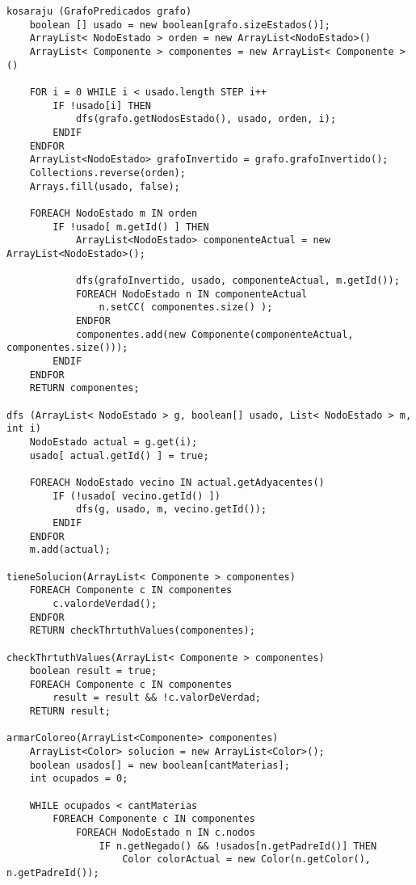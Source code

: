 \begin{verbatim}
kosaraju (GrafoPredicados grafo)
    boolean [] usado = new boolean[grafo.sizeEstados()];  
    ArrayList< NodoEstado > orden = new ArrayList<NodoEstado>() 
    ArrayList< Componente > componentes = new ArrayList< Componente >() 
    
    FOR i = 0 WHILE i < usado.length STEP i++
        IF !usado[i] THEN
            dfs(grafo.getNodosEstado(), usado, orden, i);
        ENDIF
    ENDFOR
    ArrayList<NodoEstado> grafoInvertido = grafo.grafoInvertido(); 
    Collections.reverse(orden); 
    Arrays.fill(usado, false); 
    
    FOREACH NodoEstado m IN orden 
        IF !usado[ m.getId() ] THEN
            ArrayList<NodoEstado> componenteActual = new ArrayList<NodoEstado>(); 
            
            dfs(grafoInvertido, usado, componenteActual, m.getId());
            FOREACH NodoEstado n IN componenteActual 
                n.setCC( componentes.size() ); 
            ENDFOR
            componentes.add(new Componente(componenteActual, componentes.size())); 
        ENDIF
    ENDFOR
    RETURN componentes;

dfs (ArrayList< NodoEstado > g, boolean[] usado, List< NodoEstado > m, int i)
    NodoEstado actual = g.get(i); 
    usado[ actual.getId() ] = true; 
    
    FOREACH NodoEstado vecino IN actual.getAdyacentes()
        IF (!usado[ vecino.getId() ])
            dfs(g, usado, m, vecino.getId());
        ENDIF
    ENDFOR
    m.add(actual);

tieneSolucion(ArrayList< Componente > componentes)
    FOREACH Componente c IN componentes
        c.valordeVerdad();    
    ENDFOR
    RETURN checkThrtuthValues(componentes);

checkThrtuthValues(ArrayList< Componente > componentes)
    boolean result = true;
    FOREACH Componente c IN componentes
        result = result && !c.valorDeVerdad;
    RETURN result;

armarColoreo(ArrayList<Componente> componentes)
    ArrayList<Color> solucion = new ArrayList<Color>();
    boolean usados[] = new boolean[cantMaterias];
    int ocupados = 0;
    
    WHILE ocupados < cantMaterias 
        FOREACH Componente c IN componentes 
            FOREACH NodoEstado n IN c.nodos 
                IF n.getNegado() && !usados[n.getPadreId()] THEN
                    Color colorActual = new Color(n.getColor(), n.getPadreId());
                    

\end{verbatim}
